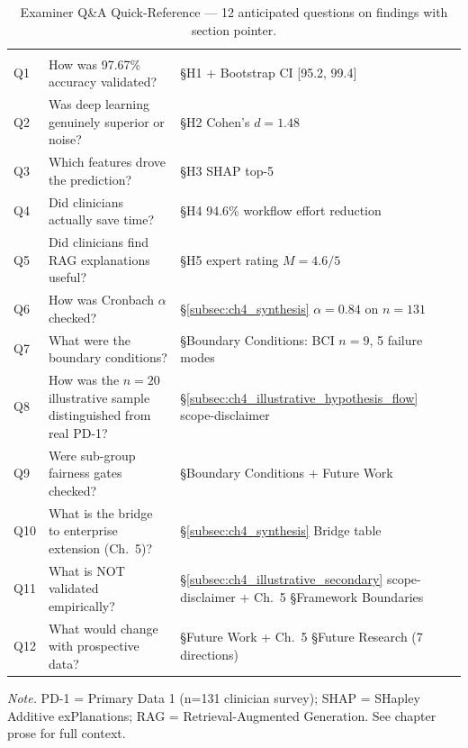 {\tablestripes\tablefontsize
\begin{xltabular}{\textwidth}{@{} >{\centering\arraybackslash}p{0.6cm} L >{\raggedright\arraybackslash}p{3.2cm} @{}}
\caption[Examiner Q\&A Quick-Reference --- Chapter~4]{Examiner Q\&A Quick-Reference --- 12 anticipated questions on findings with section pointer.}\label{tab:ch4_examiner_qa_snapshot} \\
\toprule
{} &  &  \\
\midrule
\endfirsthead
\toprule
{} &  &  \\
\midrule
\endhead
\bottomrule
\endlastfoot
Q1 & How was 97.67\% accuracy validated? & §H1 + Bootstrap CI [95.2, 99.4] \\
Q2 & Was deep learning genuinely superior or noise? & §H2 Cohen's $d=1.48$ \\
Q3 & Which features drove the prediction? & §H3 SHAP top-5 \\
Q4 & Did clinicians actually save time? & §H4 94.6\% workflow effort reduction \\
Q5 & Did clinicians find RAG explanations useful? & §H5 expert rating $M=4.6/5$ \\
Q6 & How was Cronbach $\alpha$ checked? & §\ref{subsec:ch4_synthesis} $\alpha=0.84$ on $n{=}131$ \\
Q7 & What were the boundary conditions? & §Boundary Conditions: BCI $n=9$, 5 failure modes \\
Q8 & How was the $n{=}20$ illustrative sample distinguished from real PD-1? & §\ref{subsec:ch4_illustrative_hypothesis_flow} scope-disclaimer \\
Q9 & Were sub-group fairness gates checked? & §Boundary Conditions + Future Work \\
Q10 & What is the bridge to enterprise extension (Ch.~5)? & §\ref{subsec:ch4_synthesis} Bridge table \\
Q11 & What is NOT validated empirically? & §\ref{subsec:ch4_illustrative_secondary} scope-disclaimer + Ch.~5 §Framework Boundaries \\
Q12 & What would change with prospective data? & §Future Work + Ch.~5 §Future Research (7 directions) \\
\end{xltabular}}
\vspace{0.3em}\noindent\textit{Note.} PD-1 = Primary Data 1 (n=131 clinician survey); SHAP = SHapley Additive exPlanations; RAG = Retrieval-Augmented Generation. See chapter prose for full context.

